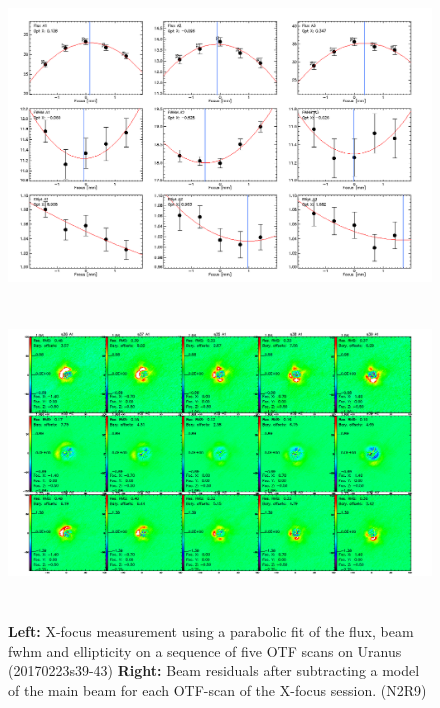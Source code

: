 \begin{figure}[h!]
\centering
\includegraphics[height=8cm]{Figures/plot_20170223s39.png}
\hspace{0.5cm}
\includegraphics[height=8cm]{Figures/residuals_focus_otf_20170223s39.png}
\caption[Lateral X focus measures]{\textbf{Left:} X-focus measurement using a
    parabolic fit of the flux, beam fwhm and ellipticity on a sequence
    of five OTF scans on Uranus (20170223s39-43) \textbf{Right:} Beam residuals
    after subtracting a model of the main beam for each OTF-scan of the X-focus
    session. (N2R9)}
\label{fig:X_focus}
\end{figure}


